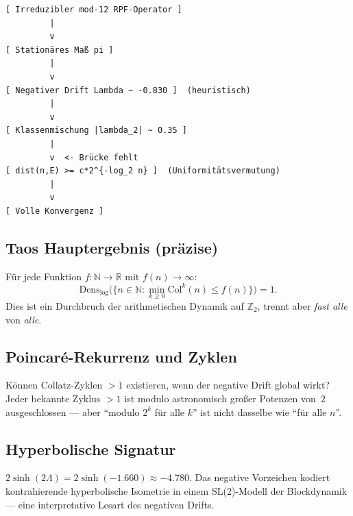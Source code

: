 \documentclass[12pt,a4paper]{article}
\newcommand{\N}{\mathbb{N}}
\newcommand{\R}{\mathbb{R}}
\newcommand{\Ztwo}{\mathbb{Z}_2}
\newcommand{\col}{\mathrm{Col}}
\newcommand{\Lam}{\Lambda}
\begin{document}
\begin{center}
\begin{verbatim}
[ Irreduzibler mod-12 RPF-Operator ]
         |
         v
[ Stationäres Maß pi ]
         |
         v
[ Negativer Drift Lambda ~ -0.830 ]  (heuristisch)
         |
         v
[ Klassenmischung |lambda_2| ~ 0.35 ]
         |
         v  <- Brücke fehlt
[ dist(n,E) >= c*2^{-log_2 n} ]  (Uniformitätsvermutung)
         |
         v
[ Volle Konvergenz ]
\end{verbatim}
\end{center}

\subsection{Taos Hauptergebnis (präzise)}

Für jede Funktion $f:\N\to\R$ mit $f(n)\to\infty$:
\[
  \mathrm{Dens}_{\log}\bigl(\{n\in\N : \min_{k\geq 0}\col^k(n)\leq f(n)\}\bigr)=1.
\]
Dies ist ein Durchbruch der arithmetischen Dynamik auf $\Ztwo$, trennt
aber \emph{fast alle} von \emph{alle}.

\subsection{Poincaré-Rekurrenz und Zyklen}

Können Collatz-Zyklen $>1$ existieren, wenn der negative Drift global
wirkt? Jeder bekannte Zyklus $>1$ ist modulo astronomisch großer Potenzen
von~$2$ ausgeschlossen --- aber ``modulo $2^k$ für alle $k$'' ist nicht
dasselbe wie ``für alle $n$''.

\subsection{Hyperbolische Signatur}

$2\sinh(2\Lam) = 2\sinh(-1.660) \approx -4.780$. Das negative Vorzeichen
kodiert kontrahierende hyperbolische Isometrie in einem SL(2)-Modell der
Blockdynamik --- eine interpretative Lesart des negativen Drifts.
\end{document}
